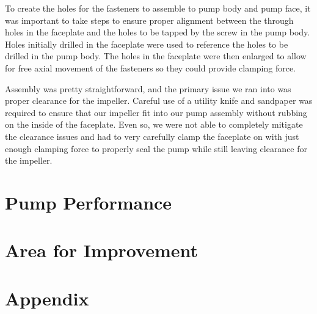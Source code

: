 \documentclass{article}
\begin{document}
\vspace{1em}
To create the holes for the fasteners to assemble to pump body and pump face,  it was important to take steps to ensure proper alignment between the through holes in the faceplate and the holes to be tapped by the screw in the pump body. Holes initially drilled in the faceplate were used to reference the holes to be drilled in the pump body. The holes in the faceplate were then enlarged to allow for free axial movement of the fasteners so they could provide clamping force.

\vspace{1em}
Assembly was pretty straightforward, and the primary issue we ran into was proper clearance for the impeller. Careful use of a utility knife and sandpaper was required to ensure that our impeller fit into our pump assembly without rubbing on the inside of the faceplate. Even so, we were not able to completely mitigate the clearance issues and had to very carefully clamp the faceplate on with just enough clamping force to properly seal the pump while still leaving clearance for the impeller.

\section{Pump Performance}
\section{Area for Improvement}
\section{Appendix}
\end{document}
